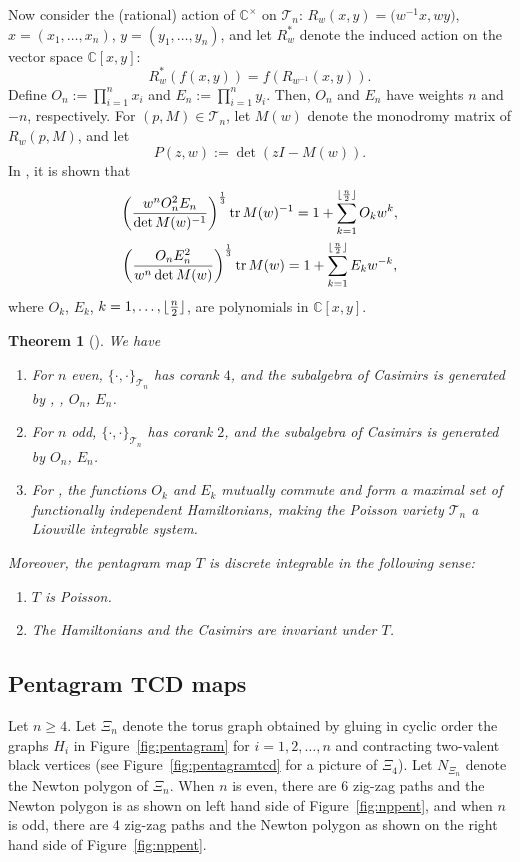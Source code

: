 \documentclass[pdftex]{sigma}
\numberwithin{equation}{section}
\newtheorem{Theorem}{Theorem}[section]
\DeclarePairedDelimiter\floor{\lfloor}{\rfloor}
\newcommand{\C}{{\mathbb C}}
\newcommand{\la}{\label}
\DeclareMathOperator{\tr}{tr}
\begin{document}
	Now consider the (rational) action of $\C^\times$ on $\mathcal T_n$: $R_w(x,y)=\big(w^{-1}x,wy\big)$, $x=(x_1,\dots,x_n)$, ${y=(y_1,\dots,y_n)}$,
	and let $R_w^*$ denote the induced action on the vector space $\C[x,y]$:
	\[
	R_w^*( f(x,y))= f(R_{w^{-1}}(x,y)).
	\]
	Define $O_n:=\prod_{i=1}^n x_i$ and $E_n:=\prod_{i=1}^n y_i$. Then, $O_n$ and $E_n$ have weights $n$ and $-n$, respectively. For $(p,M) \in \mathcal T_n$, let $M(w)$ denote the monodromy matrix of $R_w(p,M)$, and let
	\[
	P(z,w):= \det(zI-M(w)).
	\]
	In \cite{Schwartz}, it is shown that
	\begin{gather}
	\biggl(\frac{w^n O_n^2 E_n}{\det M(w)^{-1}}\biggr)^{\frac 1 3}\tr M(w)^{-1} = 1+ \sum_{k=1}^{\floor{\frac n 2}} O_k w^k, \nonumber\\
 \biggl(\frac{O_n E_n^2}{w^{n} \det M(w)}\biggr)^{\frac 1 3}\tr M(w) = 1+ \sum_{k=1}^{\floor{\frac n 2}} E_k w^{-k},\la{schinv}
	\end{gather}
	where $O_k$, $E_k$, $k=1,\dots,\floor{\frac n 2}$, are polynomials in $\C[x,y]$.
	\begin{Theorem}[\cite{OST1}]\la{thm:ost}
		We have
		\begin{enumerate}\itemsep=0pt
			\item[$1.$] For $n$ even, $\{\cdot,\cdot \}_{\mathcal T_n}$ has corank $4$, and the subalgebra of Casimirs is generated by , , $O_n$, $E_n$.
			\item[$2.$] For $n$ odd, $\{\cdot,\cdot \}_{\mathcal T_n}$ has corank $2$, and the subalgebra of Casimirs is generated by $O_n$, $E_n$.
			\item[$3.$] For , the functions $O_k$ and $E_k$ mutually commute and form a maximal set of functionally independent Hamiltonians, making the Poisson variety $\mathcal T_n$ a Liouville integrable system.
		\end{enumerate}
		Moreover, the pentagram map $T$ is discrete integrable in the following sense:
		\begin{enumerate}\itemsep=0pt
			\item[$4.$] $T$ is Poisson.
			\item[$5.$] The Hamiltonians and the Casimirs are invariant under $T$.
		\end{enumerate}
	\end{Theorem}
	
	\subsection{Pentagram TCD maps} \label{sec:pentagramtcd}
	Let $n \geq 4$. Let $\Xi_n$ denote the torus graph obtained by gluing in cyclic order the graphs $H_i$ in Figure~\ref{fig:pentagram} for $i=1,2,\dots,n$ and contracting two-valent black vertices (see Figure~\ref{fig:pentagramtcd} for a picture of $\Xi_4$).
	Let $N_{\Xi_n}$ denote the Newton polygon of $\Xi_n$.
	When $n$ is even, there are $6$ zig-zag paths and the Newton polygon is as shown on left hand side of Figure~\ref{fig:nppent}, and when $n$ is odd, there are $4$ zig-zag paths and the Newton polygon as shown on the right hand side of Figure~\ref{fig:nppent}.
	
\end{document}
